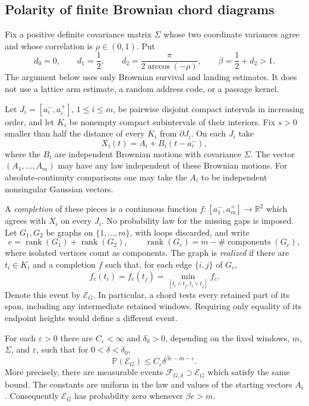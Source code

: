 \subsection{Polarity of finite Brownian chord diagrams}
\label{arm:finite-diagram-subsection}

Fix a positive definite covariance matrix $\Sigma$ whose two coordinate
variances agree and whose correlation is $\rho\in(0,1)$.  Put
\[
 d_0=0,\qquad d_1=\frac12,\qquad
 d_2=\frac{\pi}{2\arccos(-\rho)},\qquad
 \beta=\frac12+d_2>1.
\]
The argument below uses only Brownian survival and landing estimates.
It does not use a lattice arm estimate, a random address code, or a
passage kernel.

Let $J_i=[a_i^-,a_i^+]$, $1\le i\le m$, be pairwise disjoint compact
intervals in increasing order, and let $K_i$ be nonempty compact
subintervals of their interiors.  Fix $s>0$ smaller than half the
distance of every $K_i$ from $\partial J_i$.  On each $J_i$ take
\[
 X_i(t)=A_i+B_i(t-a_i^-),
\]
where the $B_i$ are independent Brownian motions with covariance
$\Sigma$.  The vector $(A_1,\ldots,A_m)$ may have any law independent
of these Brownian motions.  For absolute-continuity comparisons one
may take the $A_i$ to be independent nonsingular Gaussian vectors.

A \emph{completion} of these pieces is a continuous function
$f:[a_1^-,a_m^+]\to\mathbb R^2$ which agrees with $X_i$ on every
$J_i$.  No probability law for the missing gaps is imposed.
Let $G_1,G_2$ be graphs on $\{1,\ldots,m\}$, with loops discarded,
and write
\[
 e=\operatorname{rank}(G_1)+\operatorname{rank}(G_2),
 \qquad \operatorname{rank}(G_c)=m-\#\operatorname{components}(G_c),
\]
where isolated vertices count as components.  The graph is
\emph{realized} if there are $t_i\in K_i$ and a completion $f$ such
that, for each edge $\{i,j\}$ of $G_c$,
\begin{equation}
\label{arm:finite-diagram-chord}
 f_c(t_i)=f_c(t_j)=\min_{[t_i\wedge t_j,t_i\vee t_j]}f_c.
\end{equation}
Denote this event by $\mathcal E_G$.
In particular, a chord tests every retained part of its span, including
any intermediate retained windows.  Requiring only equality of its
endpoint heights would define a different event.

\begin{lemma}
\label{arm:finite-diagram-bound}
\label{arm:finite-diagram-polarity}
For each $\varepsilon>0$ there are $C_\varepsilon<\infty$ and
$\delta_0>0$, depending on the fixed windows, $m$, $\Sigma$, and
$\varepsilon$, such that for $0<\delta<\delta_0$,
\begin{equation}
\label{arm:finite-diagram-probability}
 \mathbb P(\mathcal E_G)
 \le C_\varepsilon\delta^{\beta e-m-\varepsilon}.
\end{equation}
More precisely, there are measurable events
$\mathcal F_{G,\delta}\supset\mathcal E_G$ which satisfy the same
bound.  The constants are uniform in the law and values of the starting
vectors $A_i$.  Consequently $\mathcal E_G$ has probability zero
whenever $\beta e>m$.
\end{lemma}

